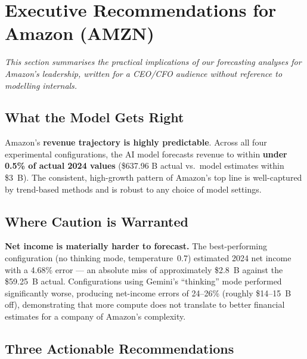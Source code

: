 \documentclass[11pt,a4paper]{article}
\begin{document}
\section{Executive Recommendations for Amazon (AMZN)}
\label{sec:amazon_exec}

\textit{This section summarises the practical implications of our forecasting
analyses for Amazon's leadership, written for a CEO/CFO audience without
reference to modelling internals.}

\subsection*{What the Model Gets Right}

Amazon's \textbf{revenue trajectory is highly predictable}.  Across all four
experimental configurations, the AI model forecasts revenue to within
\textbf{under 0.5\% of actual 2024 values} (\$637.96 B actual vs.\
model estimates within \$3~B).  The consistent, high-growth pattern of
Amazon's top line is well-captured by trend-based methods and is robust to
any choice of model settings.

\subsection*{Where Caution is Warranted}

\textbf{Net income is materially harder to forecast.}  The best-performing
configuration (no thinking mode, temperature~0.7) estimated 2024 net income
with a 4.68\% error --- an absolute miss of approximately \$2.8~B against
the \$59.25~B actual.  Configurations using Gemini's ``thinking'' mode
performed significantly worse, producing net-income errors of 24--26\%
(roughly \$14--15~B off), demonstrating that more compute does not translate
to better financial estimates for a company of Amazon's complexity.

\subsection*{Three Actionable Recommendations}
\end{document}
